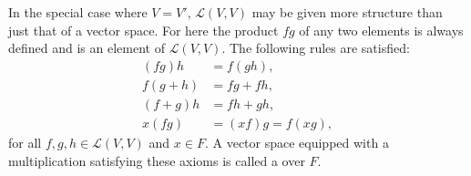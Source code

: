 In the special case where $V = V'$, $\mathcal{L}(V, V)$ may be given more structure than just that of a vector space. For here the product $fg$ of any two elements is always defined and is an element of $\mathcal{L}(V, V)$. The following rules are satisfied:
\begin{align}
(fg)h &= f(gh), \\
f(g+h) &= fg + fh, \\
(f+g)h &= fh + gh, \\
x(fg) &= (xf)g = f(xg),
\end{align}
for all $f, g, h \in \mathcal{L}(V, V)$ and $x \in F$. A vector space equipped with a multiplication satisfying these axioms is called a  over $F$.
